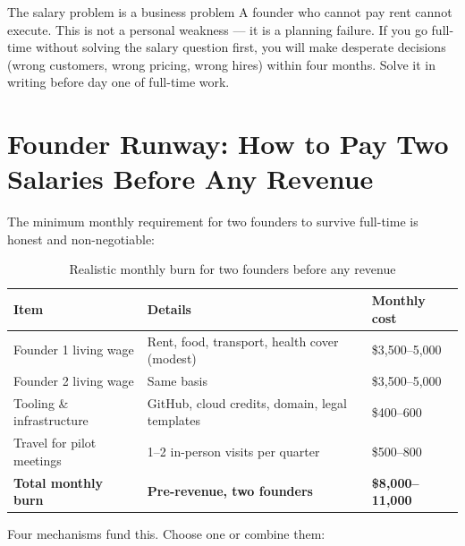 \begin{warnbox}{The salary problem is a business problem}
A founder who cannot pay rent cannot execute. This is not a personal
weakness --- it is a planning failure. If you go full-time without solving
the salary question first, you will make desperate decisions (wrong customers,
wrong pricing, wrong hires) within four months. Solve it in writing before day
one of full-time work.
\end{warnbox}

\section*{Founder Runway: How to Pay Two Salaries Before Any Revenue}

The minimum monthly requirement for two founders to survive full-time is
honest and non-negotiable:

\begin{table}[H]
\centering
\renewcommand{\arraystretch}{1.45}
\begin{tabularx}{\textwidth}{@{}lXl@{}}
\toprule
\textbf{Item} & \textbf{Details} & \textbf{Monthly cost} \\
\midrule
Founder 1 living wage & Rent, food, transport, health cover (modest) & \$3,500--5,000 \\
Founder 2 living wage & Same basis & \$3,500--5,000 \\
Tooling \& infrastructure & GitHub, cloud credits, domain, legal templates & \$400--600 \\
Travel for pilot meetings & 1--2 in-person visits per quarter & \$500--800 \\
\midrule
\textbf{Total monthly burn} & \textbf{Pre-revenue, two founders} & \textbf{\$8,000--11,000} \\
\bottomrule
\end{tabularx}
\caption{Realistic monthly burn for two founders before any revenue}
\end{table}

\noindent Four mechanisms fund this. Choose one or combine them:

